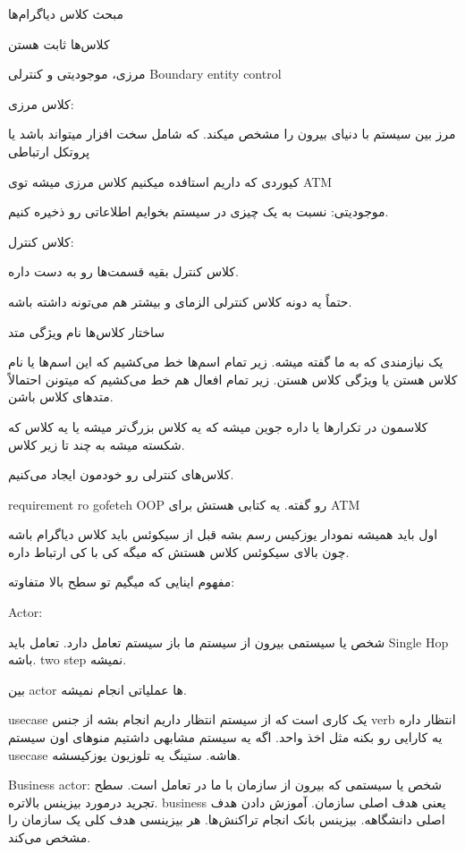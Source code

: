 

مبحث کلاس دیاگرام‌ها

کلاس‌ها ثابت هستن

مرزی، موجودیتی و کنترلی
Boundary entity control

کلاس مرزی:

مرز بین سیستم با دنیای بیرون را مشخص میکند. که شامل سخت افزار میتواند باشد یا
پروتکل ارتباطی

کیوردی که داریم استافده میکنیم کلاس مرزی میشه توی ATM

موجودیتی:
نسبت به یک چیزی در سیستم بخوایم اطلاعاتی رو ذخیره کنیم.

کلاس کنترل:

کلاس کنترل بقیه قسمت‌ها رو به دست داره.

حتماً یه دونه کلاس کنترلی الزمای و بیشتر هم می‌تونه داشته باشه.

ساختار کلاس‌ها
نام ویژگی متد

یک نیازمندی که به ما گفته میشه. زیر تمام اسم‌ها خط می‌کشیم که این اسم‌ها یا نام
کلاس هستن یا ویژگی کلاس هستن. زیر تمام افعال هم خط می‌کشیم که میتونن احتمالاً
متد‌های کلاس باشن.

کلاسمون در تکرار‌ها یا داره جوین میشه که یه کلاس بزرگ‌تر میشه یا یه کلاس که
شکسته میشه به چند تا زیر کلاس.

کلاس‌های کنترلی رو خودمون ایجاد می‌کنیم.

requirement ro gofeteh
OOP رو گفته. یه کتابی هستش برای ATM

اول باید همیشه نمودار یوزکیس رسم بشه
قبل از سیکوئس باید کلاس دیاگرام باشه
چون بالای سیکوئس کلاس هستش که میگه کی با کی ارتباط داره.

مفهوم اینایی که میگیم تو سطح بالا متفاوته: 

Actor:

شخص یا سیستمی بیرون از سیستم ما باز سیستم تعامل دارد.
تعامل باید Single Hop باشه. two step نمیشه.

بین actor ها عملیاتی انجام نمیشه.

usecase یک کاری است که از سیستم انتظار داریم انجام بشه از جنس verb انتظار داره
یه کارایی رو بکنه مثل اخذ واحد. اگه یه سیستم مشابهی داشتیم منو‌های اون سیستم
usecase هاشه. ستینگ یه تلوزیون یوزکیسشه.

Business actor: شخص یا سیستمی که بیرون از سازمان با ما در تعامل است. سطح تجرید
درمورد بیزینس بالاتره.
business یعنی هدف اصلی سازمان. آموزش دادن هدف اصلی دانشگاهه. بیزینس بانک انجام
تراکنش‌ها. هر بیزینسی هدف کلی یک سازمان را مشخص می‌کند.

